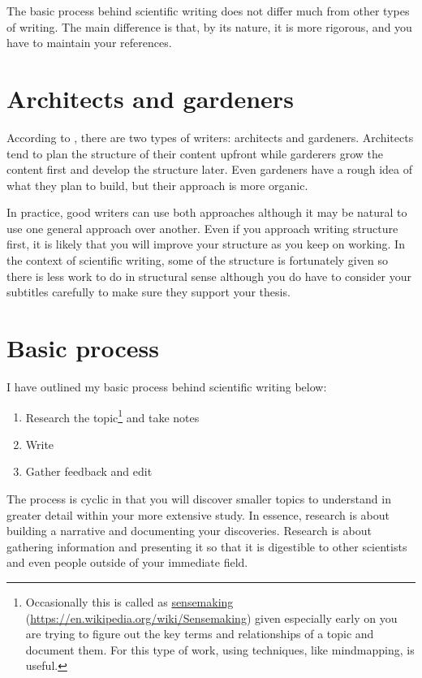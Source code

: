The basic process behind scientific writing does not differ much from other types of writing.
The main difference is that, by its nature, it is more rigorous, and you have to maintain your references.

\section{Architects and gardeners}

According to \citet{grrmArchitectsGardeners2024}, there are two types of writers: architects and gardeners.
Architects tend to plan the structure of their content upfront while garderers grow the content first and develop the structure later.
Even gardeners have a rough idea of what they plan to build, but their approach is more organic.

In practice, good writers can use both approaches although it may be natural to use one general approach over another.
Even if you approach writing structure first, it is likely that you will improve your structure as you keep on working.
In the context of scientific writing, some of the structure is fortunately given so there is less work to do in structural sense although you do have to consider your subtitles carefully to make sure they support your thesis.

\section{Basic process}

I have outlined my basic process behind scientific writing below:

\begin{enumerate}
    \item Research the topic\footnote{Occasionally this is called as \href{https://en.wikipedia.org/wiki/Sensemaking}{sensemaking} (\url{https://en.wikipedia.org/wiki/Sensemaking}) given especially early on you are trying to figure out the key terms and relationships of a topic and document them. For this type of work, using techniques, like mindmapping, is useful.} and take notes
    \item Write
    \item Gather feedback and edit
\end{enumerate}

The process is cyclic in that you will discover smaller topics to understand in greater detail within your more extensive study.
In essence, research is about building a narrative and documenting your discoveries.
Research is about gathering information and presenting it so that it is digestible to other scientists and even people outside of your immediate field.

